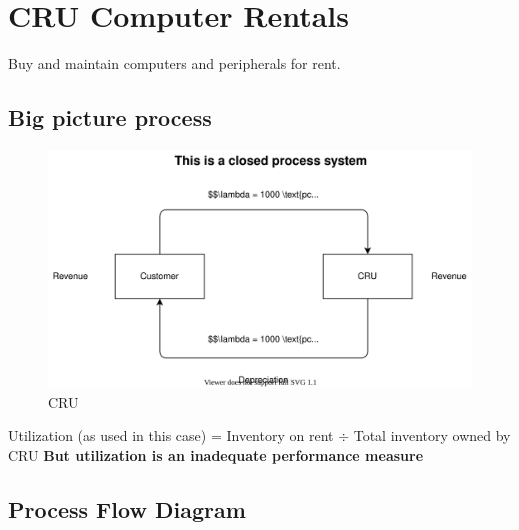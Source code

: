 \documentclass[
  paper=a4,
,captions=tableheading
]{scrartcl}
\providecommand{\tightlist}{%
  \setlength{\itemsep}{0pt}\setlength{\parskip}{0pt}}
\renewenvironment{quote}{\begin{customblockquote}\list{}{\rightmargin=0em\leftmargin=0em}%
\item\relax\color{blockquote-text}\ignorespaces}{\unskip\unskip\endlist\end{customblockquote}}
\begin{document}
\hypertarget{cru-computer-rentals}{%
\section{CRU Computer Rentals}\label{cru-computer-rentals}}

\begin{description}
\tightlist
\item[What is the nature of CRU's business?]
Buy and maintain computers and peripherals for rent.
\end{description}

\hypertarget{big-picture-process}{%
\subsection{Big picture process}\label{big-picture-process}}

\begin{figure}
\centering
\includegraphics{assets/drawio/CRU.drawio.svg}
\caption{CRU}
\end{figure}

\begin{quote}
Utilization (as used in this case) = Inventory on rent \(\div\) Total
inventory owned by CRU \textbf{But utilization is an inadequate
performance measure}
\end{quote}

\hypertarget{process-flow-diagram}{%
\subsection{Process Flow Diagram}\label{process-flow-diagram}}
\end{document}
